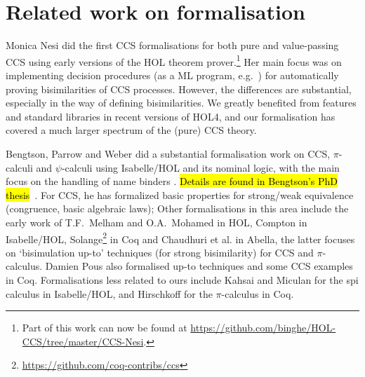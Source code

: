 \section{Related work on formalisation}
\label{s:rel}

Monica Nesi did the first CCS formalisations for both pure and
value-passing CCS \cite{Nesi:1992ve,Nesi:2017wo} using early versions of the HOL
theorem prover.\footnote{Part of this work can now be found at
  \url{https://github.com/binghe/HOL-CCS/tree/master/CCS-Nesi}.}
Her main focus was on implementing decision procedures (as a ML
program, e.g.~\cite{cleaveland1993concurrency}) for
automatically proving bisimilarities of CCS
processes. %
 However, the differences are substantial, especially in the way of defining
bisimilarities. We greatly benefited from features and standard
libraries in recent versions of HOL4, and our formalisation has
covered a much larger spectrum of the (pure) CCS theory.

Bengtson, Parrow and Weber did a substantial formalisation work
on CCS, $\pi$-calculi
and $\psi$-calculi 
using Isabelle/HOL and its nominal logic, with the main focus on the handling of
name binders \cite{bengtson2007completeness,parrow2009formalising}.
\hl{Details are found in   Bengtson's PhD thesis}~\cite{bengtson2010formalising}. For CCS, 
he has formalized basic properties for strong/weak equivalence (congruence, basic
 algebraic laws); 
%
Other formalisations in this area include the early work of T.F.~Melham
\cite{melham1994mechanized} and O.A.~Mohamed
\cite{mohamed1995mechanizing} in HOL, Compton
\cite{compton2005embedding} in Isabelle/HOL,
Solange\footnote{\url{https://github.com/coq-contribs/ccs}} in Coq
and Chaudhuri et al.\;\cite{chaudhuri2015lightweight} in Abella, the latter
focuses on `bisimulation up-to' techniques (for strong bisimilarity)
for CCS and $\pi$-calculus.
Damien Pous \cite{pous2007new} also formalised up-to techniques and some CCS examples in
Coq.
Formalisations less related to ours
include Kahsai and Miculan \cite{kahsai2008implementing} for the spi
calculus in Isabelle/HOL, and Hirschkoff \cite{hirschkoff1997full} for the $\pi$-calculus in Coq.

